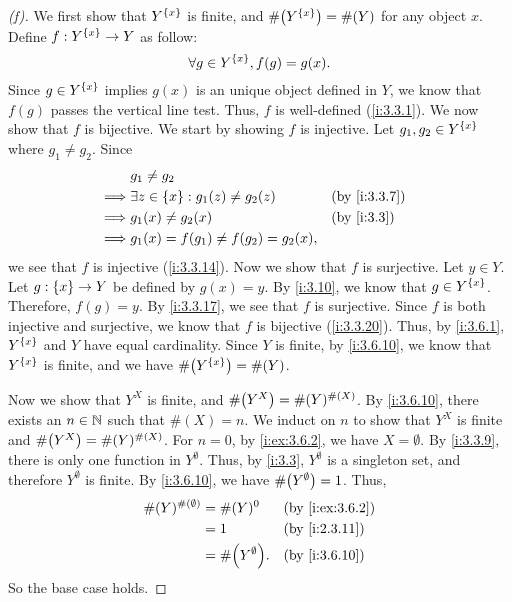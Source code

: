 \begin{proof}[(f)]
  We first show that \(Y^{\left\lbrace x\right\rbrace}\) is finite, and \(\#\pa{Y^{\set{x}}} = \#(Y)\) for any object \(x\).
  Define \(f : Y^{\left\lbrace x\right\rbrace} \to Y\) as follow:
  \[
    \forall g \in Y^{\left\lbrace x\right\rbrace}, f(g) = g(x).
  \]
  Since \(g \in Y^{\left\lbrace x\right\rbrace}\) implies \(g(x)\) is an unique object defined in \(Y\), we know that \(f(g)\) passes the vertical line test.
  Thus, \(f\) is well-defined (\cref{i:3.3.1}).
  We now show that \(f\) is bijective.
  We start by showing \(f\) is injective.
  Let \(g_1, g_2 \in Y^{\left\lbrace x\right\rbrace}\) where \(g_1 \neq g_2\).
  Since
  \begin{align*}
             & g_1 \neq g_2                                                 \\
    \implies & \exists z \in \set{x} : g_1(z) \neq g_2(z) &  & \by{i:3.3.7} \\
    \implies & g_1(x) \neq g_2(x)                         &  & \by{i:3.3}   \\
    \implies & g_1(x) = f(g_1) \neq f(g_2) = g_2(x),
  \end{align*}
  we see that \(f\) is injective (\cref{i:3.3.14}).
  Now we show that \(f\) is surjective.
  Let \(y \in Y\).
  Let \(g : \left\lbrace x\right\rbrace \to Y\) be defined by \(g(x) = y\).
  By \cref{i:3.10}, we know that \(g \in Y^{\left\lbrace x\right\rbrace}\).
  Therefore, \(f(g) = y\).
  By \cref{i:3.3.17}, we see that \(f\) is surjective.
  Since \(f\) is both injective and surjective, we know that \(f\) is bijective (\cref{i:3.3.20}).
  Thus, by \cref{i:3.6.1}, \(Y^{\left\lbrace x\right\rbrace}\) and \(Y\) have equal cardinality.
  Since \(Y\) is finite, by \cref{i:3.6.10}, we know that \(Y^{\left\lbrace x\right\rbrace}\) is finite, and we have \(\#\pa{Y^{\set{x}}} = \#(Y)\).

  Now we show that \(Y^X\) is finite, and \(\#\pa{Y^X} = \#(Y)^{\#(X)}\).
  By \cref{i:3.6.10}, there exists an \(n \in \mathbb{N}\) such that \(\#(X) = n\).
  We induct on \(n\) to show that \(Y^X\) is finite and \(\#\pa{Y^X} = \#(Y)^{\#(X)}\).
  For \(n = 0\), by \cref{i:ex:3.6.2}, we have \(X = \emptyset\).
  By \cref{i:3.3.9}, there is only one function in \(Y^\emptyset\).
  Thus, by \cref{i:3.3}, \(Y^\emptyset\) is a singleton set, and therefore \(Y^\emptyset\) is finite.
  By \cref{i:3.6.10}, we have \(\#\pa{Y^\emptyset} = 1\).
  Thus,
  \begin{align*}
    \#(Y)^{\#(\emptyset)} & = \#(Y)^0             &  & \by{i:ex:3.6.2} \\
                          & = 1                   &  & \by{i:2.3.11}   \\
                          & = \#\pa{Y^\emptyset}. &  & \by{i:3.6.10}
  \end{align*}
  So the base case holds.


\end{proof}
